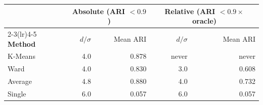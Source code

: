\begin{tabular}{lrrrr}
\toprule
& \multicolumn{2}{c}{\textbf{Absolute (ARI $<0.9$)}} & \multicolumn{2}{c}{\textbf{Relative (ARI $<0.9\times$ oracle)}} \\
\cmidrule(lr){2-3}\cmidrule(lr){4-5}
\textbf{Method} & $d/\sigma$ & Mean ARI & $d/\sigma$ & Mean ARI \\
\midrule
K-Means & 4.0 & 0.878 & never & never \\
Ward & 4.0 & 0.830 & 3.0 & 0.608 \\
Average & 4.8 & 0.880 & 4.0 & 0.732 \\
Single & 6.0 & 0.057 & 6.0 & 0.057 \\
\bottomrule
\end{tabular}
